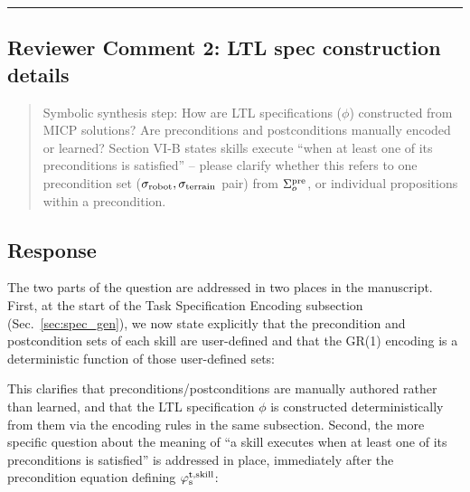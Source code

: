 \noindent\rule{17cm}{2.0pt}

\subsection{Reviewer Comment 2: LTL spec construction details}
\begin{mdframed}
\begin{quote}
Symbolic synthesis step: How are LTL specifications ($\phi$) constructed from MICP solutions? Are preconditions and postconditions manually encoded or learned? Section VI-B states skills execute ``when at least one of its preconditions is satisfied'' -- please clarify whether this refers to one precondition set ($\sigma_{\rm robot}, \sigma_{\rm terrain}$ pair) from $\Sigma^{\rm pre}_o$, or individual propositions within a precondition.
\end{quote}
\end{mdframed}

\subsection{Response}
The two parts of the question are addressed in two places in the manuscript. First, at the start of the Task Specification Encoding subsection (Sec.~\ref{sec:spec_gen}), we now state explicitly that the precondition and postcondition sets of each skill are user-defined and that the GR(1) encoding is a deterministic function of those user-defined sets:

\textit{}

This clarifies that preconditions/postconditions are manually authored rather than learned, and that the LTL specification $\phi$ is constructed deterministically from them via the encoding rules in the same subsection. Second, the more specific question about the meaning of ``a skill executes when at least one of its preconditions is satisfied'' is addressed in place, immediately after the precondition equation defining $\varphi_\textrm{s}^\textrm{t,skill}$:

\textit{}

